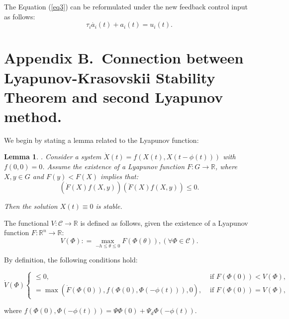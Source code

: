 \documentclass[a4paper]{cas-sc}
\newtheorem{lemma}[theorem]{Lemma}
\begin{document}
The Equation (\ref{eq3}) can be reformulated under the new feedback control input as follows:
\begin{equation}
  \tau_i\dot{a_i}\left(t\right)+a_i\left(t\right)=u_i(t).
  \label{eqapp10}
\end{equation}


\section*{Appendix B.~Connection between Lyapunov-Krasovskii Stability Theorem and second Lyapunov method.}
\label{AppendixCCC}

We begin by stating a lemma related to the Lyapunov function:
\begin{lemma}
  \label{lemmaYY}
  \citep{Kolmanovskii1999}. Consider a system $\dot{X}(t)=f(X(t), X(t-\phi\left(t\right)))$ with $f\left(0,0 \right)= 0$. Assume the existence of a Lyapunov function $F:G\rightarrow\mathbb{R}$, where $X,y\in G$ and $F\left(y\right)<F\left(X\right)$ implies that:
  \begin{equation}
    \left(\dot{F}\left(X\right)f\left(X,y\right)\right)\left(\ddot{F}\left(X\right)f\left(X,y\right)\right)\le0.
  \end{equation}

  Then the solution $X(t)\equiv0$ is stable.
\end{lemma}

The functional $V:\mathcal{C}\rightarrow\mathbb{R}$ is defined as follows, given the existence of a Lyapunov function $F:\mathbb{R}^n\rightarrow\mathbb{R}$:
\begin{equation}
  V(\Phi ): = \mathop {\max }\limits_{ - h \le \theta  \le 0} F(\Phi (\theta )),(\forall \Phi  \in \mathcal{C}).
  \label{yy1}
\end{equation}

By definition, the following conditions hold:
\begin{small}
\begin{equation}
  \dot{V}(\Phi)\left\{\begin{array}{cl}
    \leq 0,                                                          & \text { if } F(\Phi(0))<V(\Phi), \\
    =\max \left(\dot{F}(\Phi(0)), f(\Phi(0), \Phi(-\phi(t))), 0\right), & \text { if } F(\Phi(0))=V(\Phi),
  \end{array}\right.
\end{equation}
\end{small}
where $f(\Phi(0), \Phi(-\phi(t)))=\Psi\Phi(0)+\Psi_d\Phi(-\phi(t))$.
\end{document}
